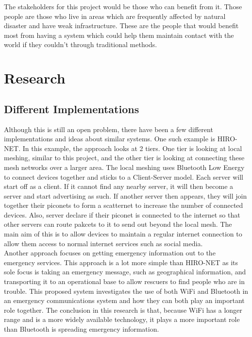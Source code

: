 \documentclass{report}
\begin{document}
The stakeholders for this project would be those who can benefit from it. Those people are those who live in areas 
which are frequently affected by natural disaster and have weak infrastructure. These are the people that would benefit 
most from having a system which could help them maintain contact with the world if they couldn't through traditional 
methods.

\chapter*{Research}

\section*{Different Implementations}

Although this is still an open problem, there have been a few different implementations and ideas about similar systems. One such example is 
HIRO-NET\cite{ferranti2019hiro}. In this example, the approach looks at 2 tiers. One tier is looking at local meshing, similar to this project, 
and the other tier is looking at connecting these mesh networks over a larger area. The local meshing uses Bluetooth Low Energy to connect 
devices together and sticks to a Client-Server model. Each server will start off as a client. If it cannot find any nearby server, it will then 
become a server and start advertising as such. If another server then appears, they will join together their piconets to form a scatternet 
to increase the number of connected devices. Also, server declare if their piconet is connected to the internet so that other servers can route 
pakcets to it to send out beyond the local mesh. The main aim of this is to allow devices to maintain a regular internet connection to allow them 
access to normal internet services such as social media. 
\bigskip\\
Another approach focuses on getting emergency information out to the emergency services\cite{wu2011emergency}. This approach is a lot more simple than 
HIRO-NET as its sole focus is taking an emergency message, such as geographical information, and transporting it to an operational base to allow rescuers 
to find people who are in trouble. This proposed system investigates the use of both WiFi and Bluetooth in an emergency communications system and how they 
can both play an important role together. The conclusion in this research is that, because WiFi has a longer range and is a more widely available technology, 
it plays a more important role than Bluetooth is spreading emergency information. 
\end{document}
